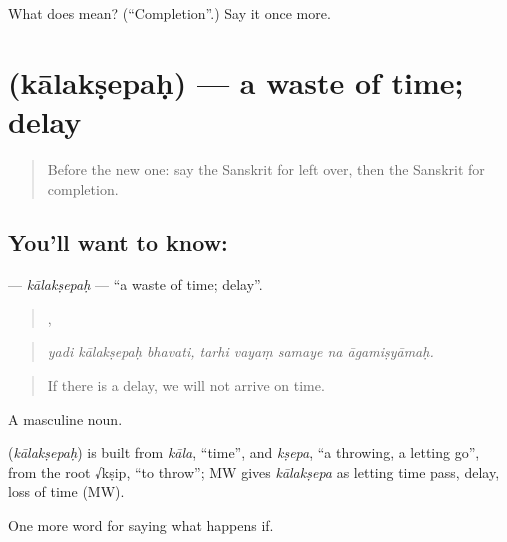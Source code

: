 \begin{tcolorbox}[breakable,colback=teal!4,colframe=teal!35!black,title={Before you move on}]
What does  mean? (\textquotedblleft{}Completion\textquotedblright{}.) Say it once more.
\end{tcolorbox}
\section[\texorpdfstring{\sk{कालक्षेपः} (kālakṣepaḥ)}{कालक्षेपः (kālakṣepaḥ)}]{ (kālakṣepaḥ) — a waste of time; delay}

\label{lesson:SA-C540-kalaksepah}



\begin{quote}
Before the new one: say the Sanskrit for left over, then the Sanskrit for completion.
\end{quote}

\subsection*{You'll want to know: }
\textbf{} — \emph{kālakṣepaḥ} — \textquotedblleft{}a waste of time; delay\textquotedblright{}.

\begin{quote}
  ,     
\end{quote}

\begin{quote}
\emph{yadi kālakṣepaḥ bhavati, tarhi vayaṃ samaye na āgamiṣyāmaḥ.}
\end{quote}

\begin{quote}
If there is a delay, we will not arrive on time.
\end{quote}

A masculine noun.

\begin{cousinweb}
\textbf{} (\emph{kālakṣepaḥ}) is built from \emph{kāla}, \textquotedblleft{}time\textquotedblright{}, and \emph{kṣepa}, \textquotedblleft{}a throwing, a letting go\textquotedblright{}, from the root √kṣip, \textquotedblleft{}to throw\textquotedblright{}; MW gives \emph{kālakṣepa} as letting time pass, delay, loss of time (MW).
\end{cousinweb}

\begin{grammarlens}[title={What you've built}]
One more word for saying what happens if.
\end{grammarlens}


